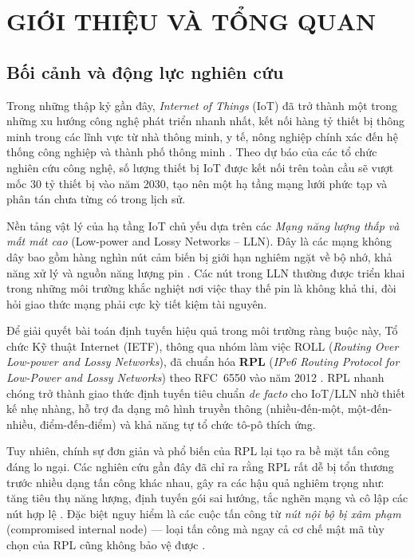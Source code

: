 \section{GIỚI THIỆU VÀ TỔNG QUAN}
\label{sec:ch1}

\subsection{Bối cảnh và động lực nghiên cứu}
\label{subsec:context}

Trong những thập kỷ gần đây, \textit{Internet of Things} (IoT) đã trở thành
một trong những xu hướng công nghệ phát triển nhanh nhất, kết nối hàng tỷ
thiết bị thông minh trong các lĩnh vực từ nhà thông minh, y tế, nông nghiệp
chính xác đến hệ thống công nghiệp và thành phố thông minh \cite{prajisha2025dis}.
Theo dự báo của các tổ chức nghiên cứu công nghệ, số lượng thiết bị IoT được
kết nối trên toàn cầu sẽ vượt mốc 30 tỷ thiết bị vào năm 2030, tạo nên một
hạ tầng mạng lưới phức tạp và phân tán chưa từng có trong lịch sử.

Nền tảng vật lý của hạ tầng IoT chủ yếu dựa trên các \textit{Mạng năng lượng
thấp và mất mát cao} (Low-power and Lossy Networks -- LLN). Đây là các mạng
không dây bao gồm hàng nghìn nút cảm biến bị giới hạn nghiêm ngặt về bộ nhớ,
khả năng xử lý và nguồn năng lượng pin \cite{prajisha2025dis}. Các nút trong
LLN thường được triển khai trong những môi trường khắc nghiệt nơi việc thay
thế pin là không khả thi, đòi hỏi giao thức mạng phải cực kỳ tiết kiệm tài
nguyên.

Để giải quyết bài toán định tuyến hiệu quả trong môi trường ràng buộc này,
Tổ chức Kỹ thuật Internet (IETF), thông qua nhóm làm việc ROLL
(\textit{Routing Over Low-power and Lossy Networks}), đã chuẩn hóa \textbf{RPL}
(\textit{IPv6 Routing Protocol for Low-Power and Lossy Networks}) theo
RFC~6550 vào năm 2012 \cite{winter2012rpl}. RPL nhanh chóng trở thành
giao thức định tuyến tiêu chuẩn \textit{de facto} cho IoT/LLN nhờ thiết kế
nhẹ nhàng, hỗ trợ đa dạng mô hình truyền thông (nhiều-đến-một,
một-đến-nhiều, điểm-đến-điểm) và khả năng tự tổ chức tô-pô thích ứng.

Tuy nhiên, chính sự đơn giản và phổ biến của RPL lại tạo ra bề mặt tấn công
đáng lo ngại. Các nghiên cứu gần đây đã chỉ ra rằng RPL rất dễ bị tổn thương
trước nhiều dạng tấn công khác nhau, gây ra các hậu quả nghiêm trọng như:
tăng tiêu thụ năng lượng, định tuyến gói sai hướng, tắc nghẽn mạng và cô lập
các nút hợp lệ \cite{prajisha2025dis}. Đặc biệt nguy hiểm là các cuộc tấn
công từ \textit{nút nội bộ bị xâm phạm} (compromised internal node) ---
loại tấn công mà ngay cả cơ chế mật mã tùy chọn của RPL cũng không bảo vệ
được \cite{dvir2011vera}.

